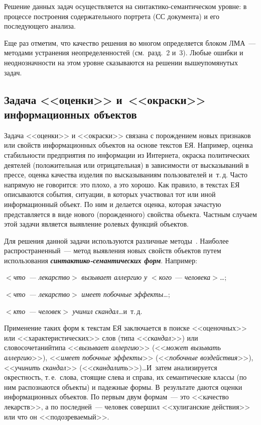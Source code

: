 \begin{multicols}{2}
Решение данных задач осуществляется на 
син\-так\-ти\-ко-се\-ман\-ти\-че\-ском уровне: в процессе построения 
содержательного портрета (СС документа) и его последующего анализа. 
     
     Еще раз отметим, что качество решения во многом определяется блоком 
ЛМА~--- методами устранения 
неопределенностей (см.\ разд.~2 и~3). Любые ошибки и неоднозначности на 
этом уровне сказываются на решении вышеупомянутых задач.

\vspace*{-6pt}
     
\subsection{Задача <<оценки>> и~<<окраски>> информационных 
объектов} 
     
     Задача <<оценки>> и <<окраски>> связана с по\-рож\-де\-нием новых 
признаков или свойств информационных объектов на основе текстов ЕЯ. 
Например, оценка стабильности предприятия по информации из Интернета, 
окраска политических деятелей (положительная или отрицательная) в 
зависимости от высказываний в прессе, оценка качества изделия по 
высказываниям пользователей и~т.\,д. Часто напрямую не говорится: это 
плохо, а это хорошо. Как правило, в текстах ЕЯ описываются события, 
ситуации, в которых участвовал тот или иной информационный объект. По ним 
и делается оценка, которая зачастую представляется в виде нового 
(порожденного) свойства объекта. Частным случаем этой задачи является 
выявление ролевых функций объектов. 
     
     Для решения данной задачи используются различные 
     методы~\cite{11kuz, 17kuz}. Наиболее распространенный~--- метод 
выявления новых свойств объектов путем использования 
{\bfseries\textit{синтактико-семантических форм}}. Например: 
     
\noindent
  $<$\textit{что~--- лекарство}$>$ \textit{вызывает аллергию у} 
$<$\textit{кого}~--- \textit{человека}$>$\ldots;
  
\noindent
  $<$\textit{что~--- лекарство}$>$ \textit{имеет побочные эффекты}\ldots;
  
\noindent
  $<$\textit{кто~--- человек}$>$ \textit{учинил скандал}\ldots и~т.\,д.
     
     Применение таких форм к текстам ЕЯ заклю\-ча\-ется в поиске 
<<оценочных>> или <<характеристи\-ческих>> слов (типа <<\textit{скандал}>>) 
или словосочетаний\linebreak типа <<\textit{вызывает аллергию}>> (<<\textit{может 
вызывать аллергию}>>), <<\textit{имеет побочные эффекты}>> 
(<<\textit{побочные воздействия}>>), <<\textit{учинить скандал}>> 
(<<\textit{скандалить}>>)\ldots И~затем анализируется окрестность, т.\,е.\ 
слова, стоящие слева и справа, их семантические классы (по ним распознаются 
объекты) и па\-дежные формы. В~результате даются оценки информационных 
объектов. По первым двум формам~--- это <<качество лекарств>>, а по 
последней~--- человек совершил <<хулиганские действия>> или что он 
<<подозреваемый>>. 
     

\end{multicols}
